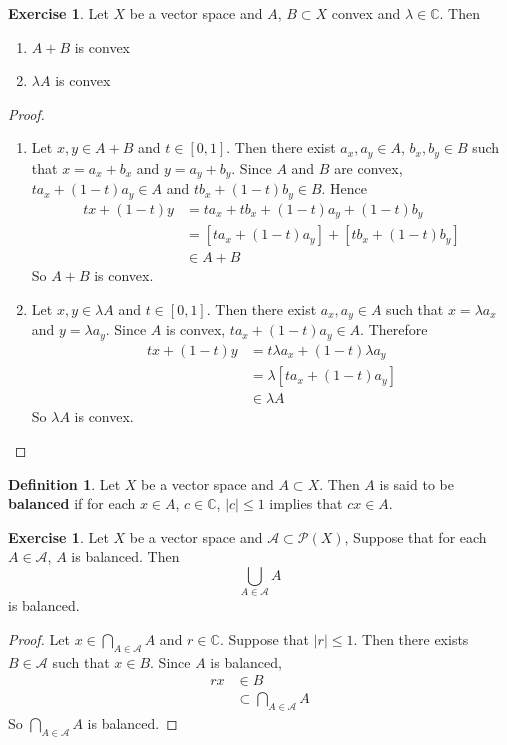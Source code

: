 \documentclass[12pt]{amsart}
\theoremstyle{definition}
\newtheorem{defn}[definition]{Definition}
\newtheorem{ex}[definition]{Exercise}
\newcommand{\lam}{\lambda}
\newcommand{\C}{\mathbb{C}}
\newcommand{\MA}{\mathcal{A}}
\newcommand{\MP}{\mathcal{P}}
\begin{document}
	\begin{ex}
		Let $X$ be a vector space and $A$, $B \subset X$ convex and $\lam \in \C$. Then 
		\begin{enumerate}
			\item $A + B$ is convex
			\item $\lam A$ is convex
		\end{enumerate}
	\end{ex}
	
	\begin{proof}\
		\begin{enumerate}
			\item Let $x,y \in A + B$ and $t \in [0,1]$. Then there exist $a_x, a_y \in A$, $b_x, b_y \in B$ such that $x = a_x + b_x$ and $y = a_y + b_y$. Since $A$ and $B$ are convex, $ta_x + (1-t)a_y \in A$ and $tb_x + (1-t)b_y \in B$. Hence 
			\begin{align*}
				tx + (1-t)y
				&= ta_x + tb_x + (1-t)a_y + (1-t)b_y \\
				&= [ta_x + (1-t)a_y] + [tb_x + (1-t)b_y] \\
				& \in A + B
			\end{align*}
			So $A + B$ is convex.
			\item Let $x, y \in \lam A$ and $t \in [0,1]$. Then there exist $a_x, a_y \in A$ such that $x = \lam a_x$ and $y = \lam a_y$. Since $A$ is convex, $t a_x + (1-t) a_y \in A$. Therefore 
			\begin{align*}
				tx + (1-t)y 
				&= t \lam a_x + (1-t) \lam a_y \\
				&= \lam [t a_x + (1-t) a_y ] \\
				& \in \lam A
			\end{align*}
			So $\lam A$ is convex.
		\end{enumerate}
	\end{proof}

		\begin{defn}
		Let $X$ be a vector space and $A \subset X$. Then $A$ is said to be \textbf{balanced} if for each $x \in A$, $c \in \C$, $|c| \leq 1$ implies that $cx \in A$.
	\end{defn}

		\begin{ex}
		Let $X$ be a vector space and $\MA \subset \MP(X)$, Suppose that for each $A \in \MA$, $A$ is balanced. Then $$\bigcup_{A \in \MA} A$$ is balanced.
	\end{ex}
	
	\begin{proof}
		Let $x \in \bigcap\limits_{A \in \MA} A$ and $r \in \C$. Suppose that $|r| \leq 1$. Then there exists $B \in \MA$ such that $x \in B$. Since $A$ is balanced, 
		\begin{align*}
			rx 
			&\in B \\
			& \subset \bigcap\limits_{A \in \MA} A
		\end{align*}
		So $\bigcap\limits_{A \in \MA} A$ is balanced.
	\end{proof}
\end{document}
